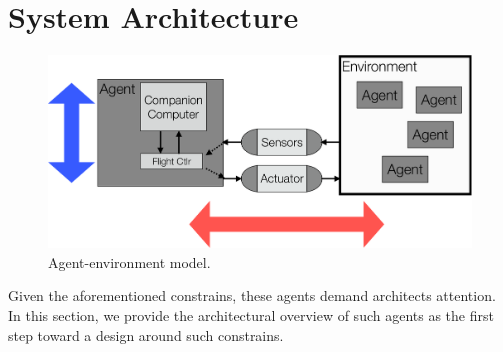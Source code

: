 \section{System Architecture} %

\begin{figure}[t!]
\centering
\includegraphics[width=0.9\columnwidth]{figs/agent_env.pdf}
\vspace{1.0ex}
\caption{Agent-environment model.}
\vspace{-3ex}
\label{fig:1}
\end{figure}
Given the aforementioned constrains, these agents demand architects attention. In this section, we provide the architectural overview of such agents as the first step toward a design around such constrains.  


